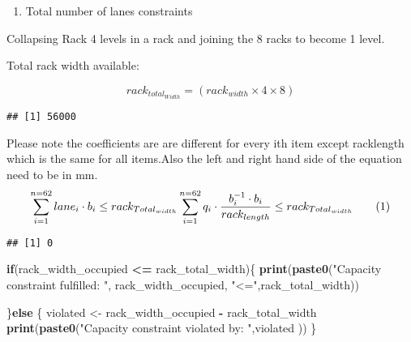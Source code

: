 \documentclass[
]{article}
\newenvironment{Shaded}{\begin{snugshade}}{\end{snugshade}}
\newcommand{\CommentTok}[1]{\textcolor[rgb]{0.56,0.35,0.01}{\textit{#1}}}
\newcommand{\ControlFlowTok}[1]{\textcolor[rgb]{0.13,0.29,0.53}{\textbf{#1}}}
\newcommand{\DecValTok}[1]{\textcolor[rgb]{0.00,0.00,0.81}{#1}}
\newcommand{\KeywordTok}[1]{\textcolor[rgb]{0.13,0.29,0.53}{\textbf{#1}}}
\newcommand{\NormalTok}[1]{#1}
\newcommand{\OperatorTok}[1]{\textcolor[rgb]{0.81,0.36,0.00}{\textbf{#1}}}
\newcommand{\StringTok}[1]{\textcolor[rgb]{0.31,0.60,0.02}{#1}}
\providecommand{\tightlist}{%
  \setlength{\itemsep}{0pt}\setlength{\parskip}{0pt}}
\begin{document}
\begin{enumerate}
\def\labelenumi{\arabic{enumi}.}
\setcounter{enumi}{2}
\tightlist
\item
  Total number of lanes constraints
\end{enumerate}

Collapsing Rack 4 levels in a rack and joining the 8 racks to become 1
level.

Total rack width available:

\[rack_{total_{Width}}=(rack_{width} \times 4 \times 8)\]

\begin{Shaded}
\end{Shaded}

\begin{verbatim}
## [1] 56000
\end{verbatim}

Please note the coefficients are are different for every ith item except
racklength which is the same for all items.Also the left and right hand
side of the equation need to be in mm.
\[\sum_{i=1}^{n=62}lane_i \cdot b_i\le rack_{Total_{width}} \\ \sum_{i=1}^{n=62} q_i \cdot \frac {b_i^{-1} \cdot b_i}{rack_{length}} \le rack_{Total_{width}} \quad \quad (1)\]

\begin{Shaded}
\end{Shaded}

\begin{verbatim}
## [1] 0
\end{verbatim}

\begin{Shaded}
\begin{Highlighting}[]
\ControlFlowTok{if}\NormalTok{(rack_width_occupied }\OperatorTok{<=}\StringTok{ }\NormalTok{rack_total_width)\{}
  \KeywordTok{print}\NormalTok{(}\KeywordTok{paste0}\NormalTok{(}\StringTok{"Capacity constraint fulfilled: "}\NormalTok{, rack_width_occupied, }\StringTok{"<="}\NormalTok{,rack_total_width))}
 
\NormalTok{\}}\ControlFlowTok{else}\NormalTok{ \{}
\NormalTok{  violated <-}\StringTok{ }\NormalTok{rack_width_occupied }\OperatorTok{-}\StringTok{ }\NormalTok{rack_total_width}
  \KeywordTok{print}\NormalTok{(}\KeywordTok{paste0}\NormalTok{(}\StringTok{"Capacity constraint violated by: "}\NormalTok{,violated ))}
\NormalTok{\}}
\end{Highlighting}
\end{Shaded}
\end{document}
